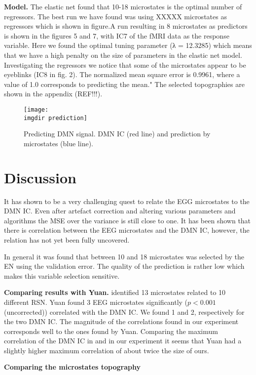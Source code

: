 \documentclass{article}
\newcommand{\imgdir}{Images/} %
\begin{document}
\textbf{Model.} The elastic net found that 10-18 microstates is the optimal number of regressors.  The best run we have found was using XXXXX microstates as regressors which is shown in figure.A run resulting in 8 microstates as predictors is shown in the figures 5 and 7, 
with IC7 of the fMRI data as the response variable. Here we found the optimal 
tuning parameter (λ = 12.3285) which means that we have a high penalty on
the size of parameters in the elastic net model.
Investigating the regressors we notice that some of the microstates appear 
to be eyeblinks (IC8  in fig. 2).
The normalized mean square error is 0.9961, where a value of 1.0 
corresponds to predicting the mean."
The selected topographies are shown in the appendix (REF!!!).

\begin{figure}[!ht]
    \centering
    \texttt{[image: \\imgdir prediction]}
    \caption{Predicting DMN signal. DMN IC (red line) and prediction by microstates (blue line).}
    \label{fig:grid}
\end{figure}

\section{Discussion}
It has shown to be a very challenging quest to relate the EGG microstates to the DMN IC. Even after artefact correction and altering various parameters and algorithms the MSE over the variance is still close to one. It has been shown that there is correlation between the EEG microstates and the DMN IC, however, the relation has not yet been fully uncovered.

In general it was found that between 10 and 18 microstates was selected by the EN using the validation error. The quality of the prediction is rather low which makes this variable selection sensitive.

\textbf{Comparing results with Yuan.} \cite{Yuan20122062} identified 13 microstates related to 10 different RSN. Yuan found 3 EEG microstates significantly ($p<0.001$ (uncorrected)) correlated with the DMN IC. We found 1 and 2, respectively for the two DMN IC.
The magnitude of the correlations found in our experiment corresponds well to the ones found by Yuan. Comparing the maximum correlation of the DMN IC in \cite{Yuan20122062} and in our experiment it seems that Yuan had a slightly higher maximum correlation of about twice the size of ours.


\textbf{Comparing the microstates topography} 
\end{document}

